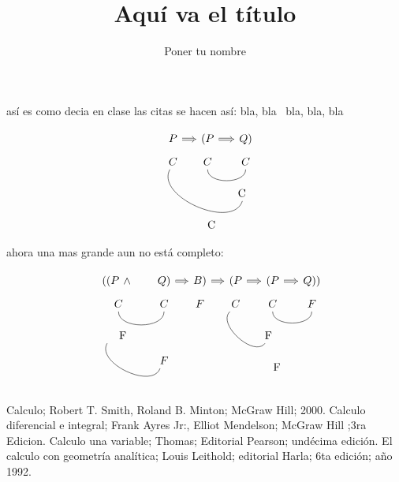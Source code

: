 \documentclass[11pt]{article}
\title{\textsf{
Aquí va el título
}}
\author{Poner tu nombre }
\begin{document}
  \maketitle



así es como decia en clase las citas se hacen así: bla, bla~\cite{3} bla, bla, bla



$$
\begin{tikzcd}[column sep=small, row sep=tiny]
& P \ar[r, Rightarrow] & (P \ar[r, Rightarrow] & Q ) \\
& C \ar[drr, bend right = 95, dash]      & C \ar[r, bend right = 90, dash]  & C \\
&   							     &                  & \parbox{0.5cm}{\flushleft C} \\
&  &\parbox{0.5cm}{\flushright C} &
\end{tikzcd}
$$


ahora una mas grande aun no está completo:

$$
\begin{tikzcd}[column sep=small, row sep=tiny]
& ((P \parbox{0.5cm}{\centering$\wedge$} & Q)\ar[r, Rightarrow] & B) \ar[r,Rightarrow]   & (P \ar[r, Rightarrow] & (P \ar[r, Rightarrow] & Q )) \\
& C \ar[r, bend right = 90, dash] & C &  F & C \ar[dr, bend right = 95, dash]      & C \ar[r, bend right = 90, dash]  & F \\
& \parbox{0.5cm}{\flushright F} \ar[dr, bend right = 95, dash] &  & 									   &                  & \parbox{0.5cm}{\flushleft F} \\
& & F & &  &\parbox{0.5cm}{\flushright F} &
\end{tikzcd}
$$




\begin{thebibliography}{99}
  Calculo; Robert T. Smith, Roland B. Minton; McGraw Hill; 2000.
  Calculo diferencial e integral; Frank Ayres Jr:, Elliot Mendelson; McGraw Hill ;3ra Edicion.
  Calculo una variable; Thomas; Editorial Pearson; undécima edición.
  El calculo con geometría analítica; Louis Leithold; editorial Harla; 6ta edición; año 1992.
\end{thebibliography}
\end{document}

